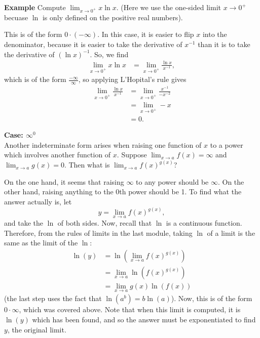 \documentclass[twoside,openright,titlepage,a4paper]{book}
\begin{document}
\begin{sloppypar}
\textbf{Example} Compute $\displaystyle \lim_{x \rightarrow 0^+} x \ln x$. (Here we use the one-sided limit $x \rightarrow 0^+$ becuase $\ln$ is only defined on the positive real numbers).
\begin{examplebox}
This is of the form $0 \cdot (-\infty)$. In this case, it is easier to flip $x$ into the denominator, because it is easier to take the derivative of $x^{-1}$ than it is to take the derivative of $(\ln x)^{-1}$. So, we find
\begin{align*}
\lim_{x \rightarrow 0^+} x \ln x &= \lim_{x \rightarrow 0^+} \frac{ \ln x}{x^{-1}},
\end{align*}
which is of the form $\frac{-\infty}{\infty}$, so applying L'Hopital's rule gives
\begin{align*}
\lim_{x \rightarrow 0^+} \frac{ \ln x}{x^{-1}} &= \lim_{x \rightarrow 0^+} \frac{x^{-1}}{-x^{-2}} \\
&= \lim_{x \rightarrow 0^+} -x \\
&= 0.
\end{align*} 
\end{examplebox}
\bigbreak
\noindent \textbf{Case: $\infty^0$}\\

Another indeterminate form arises when raising one function of $x$ to a power which involves another function of $x$. Suppose $\displaystyle \lim_{x \rightarrow a} f(x) = \infty$ and $\displaystyle \lim_{x \rightarrow a} g(x) = 0$. Then what is $\displaystyle \lim_{x \rightarrow a} f(x)^{g\left(x\right)}$?

On the one hand, it seems that raising $\infty$ to any power should be $\infty$. On the other hand, raising anything to the 0th power should be 1. To find what the answer actually is, let \[ y = \lim_{x \rightarrow a} f(x)^{g\left(x\right)}, \] and take the $\ln$ of both sides. Now, recall that $\ln$ is a continuous function. Therefore, from the rules of limits in the last module, taking $\ln$ of a limit is the same as the limit of the $\ln$:
\begin{align*}
\ln(y) &= \ln\left(\lim_{x\rightarrow a} f(x)^{g\left(x\right)}\right) \\
&= \lim_{x \rightarrow a} \ln \left(f(x)^{g\left(x\right)}\right) \\
&= \lim_{x \rightarrow a} g(x) \ln(f(x))
\end{align*}
(the last step uses the fact that $\ln(a^b) = b\ln(a)$). Now, this is of the form $0 \cdot \infty$, which was covered above. Note that when this limit is computed, it is $\ln(y)$ which has been found, and so the answer must be exponentiated to find $y$, the original limit.


\end{sloppypar}
\end{document}
